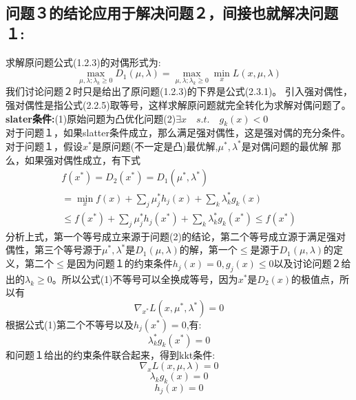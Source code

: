 \documentclass{article}
\begin{document}
\subsection{问题３的结论应用于解决问题２，间接也就解决问题１:}
求解原问题公式(1.2.3)的对偶形式为:
\begin{equation}
\max_{\mu,\lambda;\lambda_k \ge 0}D_1(\mu,\lambda)=\max_{\mu,\lambda;\lambda_k \ge 0}\min_{x}L(x,\mu,\lambda) \tag{2.3.1}
\end{equation}
我们讨论问题２时只是给出了原问题(1.2.3)的下界是公式(2.3.1)。
引入强对偶性，强对偶性是指公式(2.2.5)取等号，这样求解原问题就完全转化为求解对偶问题了。\\
\textbf{slater条件:}(1)原始问题为凸优化问题(2)$\exists x \quad  s.t. \quad g_k(x)<0$
\\对于问题１，如果slatter条件成立，那么满足强对偶性，这是强对偶的充分条件。\\
对于问题１，假设$x^*$是原问题(不一定是凸)最优解,$\mu^*,\lambda^*$是对偶问题的最优解
那么，如果强对偶性成立，有下式
\begin{equation}
\begin{split}
f(x^*)=D_2(x^*)=D_1(\mu^*,\lambda^*)\qquad\\
	 =\min_{x}f(x)+\sum_j\mu_j^*h_j(x)+\sum_k\lambda_k^*g_k(x)\\
	 \le f(x^*)+\sum_j\mu_j^*h_j(x^*)+\sum_k\lambda_k^*g_k(x^*)\le f(x^*)
\end{split}
\end{equation}
分析上式，第一个等号成立来源于问题(2)的结论，第二个等号成立源于满足强对偶性，第三个等号源于$\mu^*,\lambda^*$是$D_1(\mu,\lambda)$的解，第一个$\le$是源于$D_1(\mu,\lambda)$的定义，第二个$\le$是因为问题１的约束条件$h_j(x)=0,g_j(x) \le 0$以及讨论问题２给出的$\lambda_k \ge 0$。所以公式(1)不等号可以全换成等号，因为$x^*$是$D_2(x)$的极值点，所以有
\begin{equation}
\nabla_{x^*}L(x,\mu^*,\lambda^*)=0  \tag{2.3.2}
\end{equation}
根据公式(1)第二个不等号以及$h_j(x^*)=0$,有:
\begin{equation}
\lambda_k^*g_k(x^*)=0 \tag{2.3.3}
\end{equation}
和问题１给出的约束条件联合起来，得到kkt条件:
\begin{equation}
\nabla_{x}L(x,\mu,\lambda)=0  \tag{2.3.4}
\end{equation}
\begin{equation}
\lambda_kg_k(x)=0 \tag{2.3.5}
\end{equation}
\begin{equation}
h_j(x)=0 \tag{2.3.6}
\end{equation}
\end{document}
